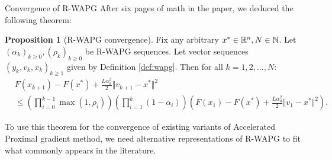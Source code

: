 \documentclass[11pt]{beamer}
\theoremstyle{definition}
\newtheorem{proposition}{Proposition}[section]
\begin{document}
        \begin{frame}{Convergence of R-WAPG}
            After six pages of math in the paper, we deduced the following theorem: 
            \begin{proposition}[R-WAPG convergence]\label{prop:wapg-convergence}
                Fix any arbitrary $x^* \in \mathbb R^n, N \in \mathbb N$.
                Let $(\alpha_k)_{k \ge 0}, (\rho_k)_{k \ge 0}$ be R-WAPG sequences.
                Let vector sequences $(y_k, v_{k}, x_{k})_{k \ge 1}$ given by Definition \ref{def:wapg}. 
                Then for all $k = 1, 2, \ldots, N$:
                {\small
                \begin{align*}
                    & F(x_{k + 1}) - F(x^*) + \frac{L \alpha_k^2}{2}\Vert v_{k + 1} - x^*\Vert^2
                    \\
                    &\le
                    \left(
                        \prod_{i = 0}^{k - 1} \max(1, \rho_{i})
                    \right)
                    \left(
                        \prod_{i = 1}^{k} \left(1  - \alpha_i\right)
                    \right)
                    \left(
                        F(x_1) - F(x^*) + \frac{L\alpha_0^2}{2}\Vert v_1 - x^*\Vert^2
                    \right).
                \end{align*}
                }
            \end{proposition}
            To use this theorem for the convergence of existing variants of Accelerated Proximal gradient method, we need alternative representations of R-WAPG to fit what commonly appears in the literature. 
        \end{frame}
\end{document}
